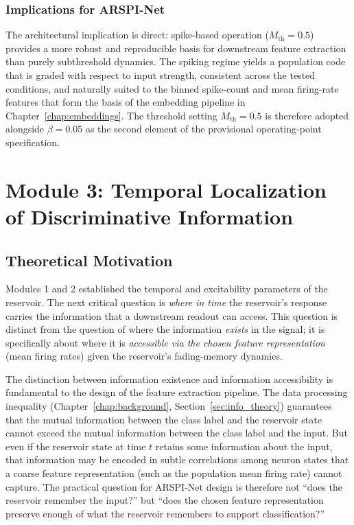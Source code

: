 \subsubsection{Implications for ARSPI-Net}

The architectural implication is direct: spike-based operation ($M_{\text{th}} = 0.5$) provides a more robust and reproducible basis for downstream feature extraction than purely subthreshold dynamics. The spiking regime yields a population code that is graded with respect to input strength, consistent across the tested conditions, and naturally suited to the binned spike-count and mean firing-rate features that form the basis of the embedding pipeline in Chapter~\ref{chap:embeddings}. The threshold setting $M_{\text{th}} = 0.5$ is therefore adopted alongside $\beta = 0.05$ as the second element of the provisional operating-point specification.


\section{Module 3: Temporal Localization of Discriminative Information}
\label{sec:module3}

\subsection{Theoretical Motivation}

Modules 1 and 2 established the temporal and excitability parameters of the reservoir. The next critical question is \emph{where in time} the reservoir's response carries the information that a downstream readout can access. This question is distinct from the question of where the information \emph{exists} in the signal; it is specifically about where it is \emph{accessible via the chosen feature representation} (mean firing rates) given the reservoir's fading-memory dynamics.

The distinction between information existence and information accessibility is fundamental to the design of the feature extraction pipeline. The data processing inequality (Chapter~\ref{chap:background}, Section~\ref{sec:info_theory}) guarantees that the mutual information between the class label and the reservoir state cannot exceed the mutual information between the class label and the input. But even if the reservoir state at time $t$ retains some information about the input, that information may be encoded in subtle correlations among neuron states that a coarse feature representation (such as the population mean firing rate) cannot capture. The practical question for ARSPI-Net design is therefore not ``does the reservoir remember the input?'' but ``does the chosen feature representation preserve enough of what the reservoir remembers to support classification?''

